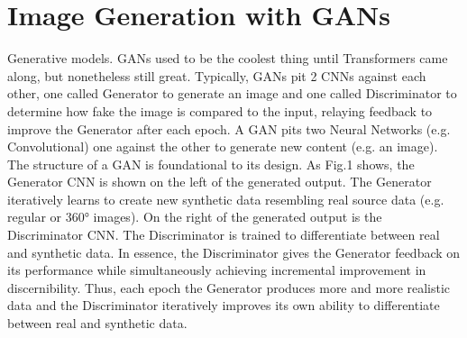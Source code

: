 


\section{Image Generation with GANs}

Generative models.
GANs used to be the coolest thing until Transformers came along, but nonetheless 
still great. Typically, GANs pit 2 CNNs against each other, one called Generator to 
generate an image and one called Discriminator to determine how fake the image is 
compared to the input, relaying feedback to improve the Generator after each epoch. 
A GAN pits two Neural Networks (e.g. Convolutional) one against the other to generate 
new content (e.g. an image). The structure of a GAN is foundational to its design. 
As Fig.1 shows, the Generator CNN is shown on the left of the generated output. 
The Generator iteratively learns to create new synthetic data resembling real source data 
(e.g. regular or 360° images).  On the right of the generated output is the Discriminator CNN.
The Discriminator is trained to differentiate between real and synthetic data. 
In essence, the Discriminator gives the Generator feedback on its performance while 
simultaneously achieving incremental improvement in discernibility. 
Thus, each epoch the Generator produces more and more realistic data and the Discriminator iteratively improves its own ability to differentiate between real and synthetic data.


